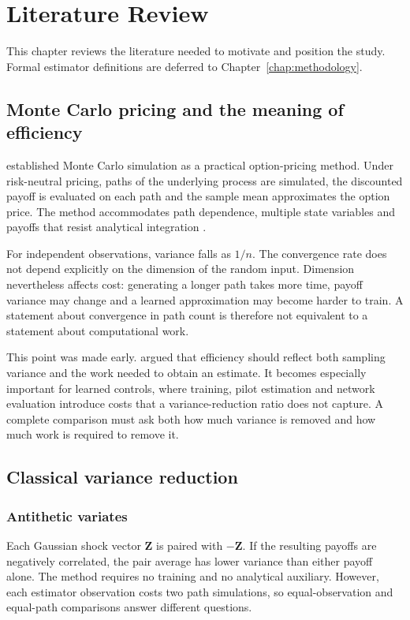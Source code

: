 \chapter{Literature Review}
\label{chap:literature_review}

This chapter reviews the literature needed to motivate and position the study. Formal estimator definitions are deferred to Chapter~\ref{chap:methodology}.

\section{Monte Carlo pricing and the meaning of efficiency}

\textcite{boyle_1977} established Monte Carlo simulation as a practical option-pricing method. Under risk-neutral pricing, paths of the underlying process are simulated, the discounted payoff is evaluated on each path and the sample mean approximates the option price. The method accommodates path dependence, multiple state variables and payoffs that resist analytical integration \parencite{glasserman_2004}.

For independent observations, variance falls as $1/n$. The convergence rate does not depend explicitly on the dimension of the random input. Dimension nevertheless affects cost: generating a longer path takes more time, payoff variance may change and a learned approximation may become harder to train. A statement about convergence in path count is therefore not equivalent to a statement about computational work.

This point was made early. \textcite{hammersley_morton_1956} argued that efficiency should reflect both sampling variance and the work needed to obtain an estimate. It becomes especially important for learned controls, where training, pilot estimation and network evaluation introduce costs that a variance-reduction ratio does not capture. A complete comparison must ask both how much variance is removed and how much work is required to remove it.

\section{Classical variance reduction}

\subsection{Antithetic variates}

Each Gaussian shock vector $\mathbf{Z}$ is paired with $-\mathbf{Z}$. If the resulting payoffs are negatively correlated, the pair average has lower variance than either payoff alone. The method requires no training and no analytical auxiliary. However, each estimator observation costs two path simulations, so equal-observation and equal-path comparisons answer different questions.

